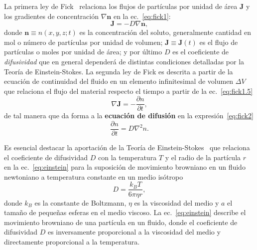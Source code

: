 \documentclass[11pt]{article}
\begin{document}
La primera ley de Fick~\cite{gilExperimentosFisicaUsando2014} relaciona los flujos de partículas por unidad de área $\mathbf{J}$ y los gradientes de concentración $\nabla \mathbf{n}$ en la ec.~\eqref{eq:fick1}:
\begin{equation}
    \mathbf{J} = -D \nabla \mathbf{n},
    \label{eq:fick1}
\end{equation}
donde $\mathbf{n}\equiv n(x,y,z;t)$ es la concentración del soluto, generalmente cantidad en mol o número de partículas por unidad de volumen; $\mathbf{J}\equiv\mathbf{J}(t)$ es el flujo de partículas o moles por unidad de área; y por último $D$ es el coeficiente de \textit{difusividad} que en general dependerá de distintas condiciones  detalladas por la Teoría de Einstein-Stokes.
La segunda ley de Fick es descrita a partir de la ecuación de continuidad del fluido en un elemento infinitesimal de volumen $\Delta V$ que relaciona el flujo del material respecto el tiempo a partir de la ec.~\eqref{eq:fick1.5}
\begin{equation}
    \nabla \mathbf{J} = -\frac{\partial n}{\partial t},
    \label{eq:fick1.5}
\end{equation}
de tal manera que da forma a la \textbf{ecuación de difusión} en la expresión~\eqref{eq:fick2}
\begin{equation}
    \frac{\partial n}{\partial t} = D \nabla^2 n.
    \label{eq:fick2}
\end{equation}

Es esencial destacar la aportación de la Teoría de Einstein-Stokes~\cite{einsteinUberMolekularkinetischenTheorie1905} que relaciona el coeficiente de difusividad $D$ con la temperatura $T$ y el radio de la partícula $r$ en la ec.~\ref{eq:einstein} para la suposición de movimiento browniano en un fluido newtoniano a temperatura constante en un medio isótropo~\cite{leeInkDifussionWater2004}
\begin{equation}
    D = \frac{k_B T}{6 \pi \eta r},
    \label{eq:einstein}
\end{equation}
donde $k_B$ es la constante de Boltzmann, $\eta$ es la viscosidad del medio y $a$ el tamaño de pequeñas esferas en el medio viscoso. La ec.~\eqref{eq:einstein} describe el movimiento browniano de una partícula en un fluido, donde el coeficiente de difusividad $D$ es inversamente proporcional a la viscosidad del medio y directamente proporcional a la temperatura.
\end{document}
